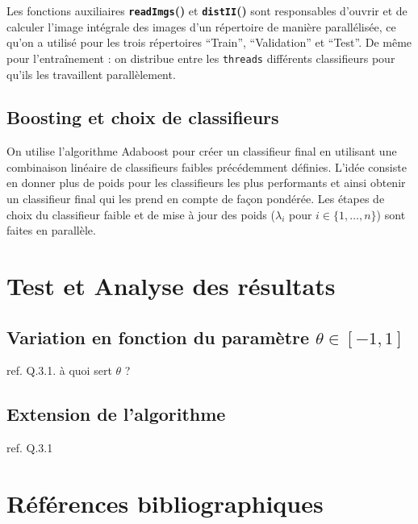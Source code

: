 \documentclass[a4paper, 12pt,twoside]{article}
\newcommand{\func}[1]{
\textbf{\texttt{#1}()}
}
\newcommand{\param}[1]{
\texttt{#1}
}
\begin{document}
	Les fonctions auxiliaires \func{readImgs} et \func{distII} sont responsables d’ouvrir et de calculer l’image intégrale des images d’un répertoire de manière parallélisée, ce qu’on a utilisé pour les trois répertoires “Train”, “Validation” et “Test”. De même pour l’entraînement : on distribue entre les \param{threads} différents classifieurs pour qu’ils les travaillent parallèlement.


\subsection{Boosting et choix de classifieurs}

	On utilise l’algorithme Adaboost pour créer un classifieur final en utilisant une combinaison linéaire de classifieurs faibles précédemment définies. L’idée consiste en donner plus de poids pour les classifieurs les plus performants et ainsi obtenir un classifieur final qui les prend en compte de façon pondérée. Les étapes de choix du classifieur faible et de mise à jour des poids ($\lambda_i $ pour $ i \in \{1, \ldots, n\}$) sont faites en parallèle.

\clearpage


\section{Test et Analyse des résultats}

\subsection{Variation en fonction du paramètre $\theta \in [-1,1]$}
ref. Q.3.1. à quoi sert $\theta$ ?

\subsection{Extension de l’algorithme}
ref. Q.3.1

\clearpage
 

\section{Références bibliographiques}
        {
        \renewcommand{\section}[2]{} %
        \nocite{*} %
        
        
        }
        
    
\end{document}
